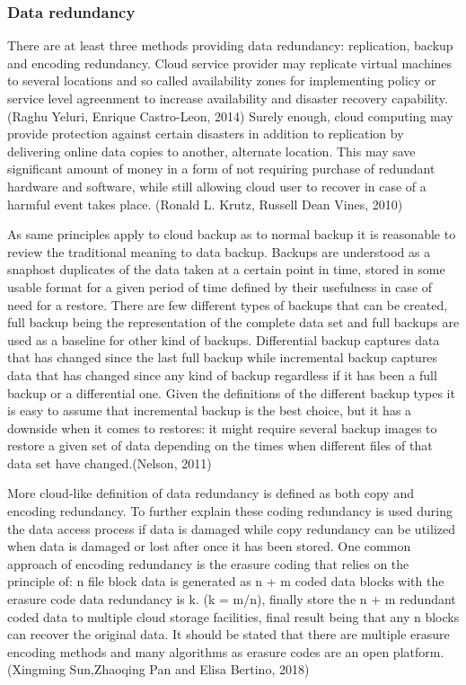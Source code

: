 \documentclass{article}
\begin{document}
\subsubsection{Data redundancy}
There are at least three methods providing data redundancy: replication, backup and encoding redundancy. Cloud service provider may replicate virtual machines to several locations and so called availability zones for implementing policy or service level agreenment to increase availability and disaster recovery capability. (Raghu Yeluri, Enrique Castro-Leon, 2014) Surely enough, cloud computing may provide protection against certain disasters in addition to replication by delivering online data copies to another, alternate location. This may save significant amount of money in a form of not requiring purchase of redundant hardware and software, while still allowing cloud user to recover in case of a harmful event takes place. (Ronald L. Krutz, Russell Dean Vines, 2010)
\par
As same principles apply to cloud backup as to normal backup it is reasonable to review the traditional meaning to data backup. Backups are understood as a snaphost duplicates of the data taken at a certain point in time, stored in some usable format for a given period of time defined by their usefulness in case of need for a restore. There are few different types of backups that can be created, full backup being the representation of the complete data set and full backups are used as a baseline for other kind of backups. Differential backup captures data that has changed since the last full backup while incremental backup captures data that has changed since any kind of backup regardless if it has been a full backup or a differential one. Given the definitions of the different backup types it is easy to assume that incremental backup is the best choice, but it has a downside when it comes to restores: it might require several backup images to restore a given set of data depending on the times when different files of that data set have changed.(Nelson, 2011)
\par
More cloud-like definition of data redundancy is defined as both copy and encoding redundancy. To further explain these coding redundancy is used during the data access process if data is damaged while copy redundancy can be utilized when data is damaged or lost after once it has been stored. One common approach of encoding redundancy is the erasure coding that relies on the principle of: n file block data is generated as n + m coded data blocks with the erasure code data redundancy is k. (k = m/n), finally store the n + m redundant coded data to multiple cloud storage facilities, final result being that any n blocks can recover the original data. It should be stated that there are multiple erasure encoding methods and many algorithms as erasure codes are an open platform. (Xingming Sun,Zhaoqing Pan and Elisa Bertino, 2018)
\end{document}
